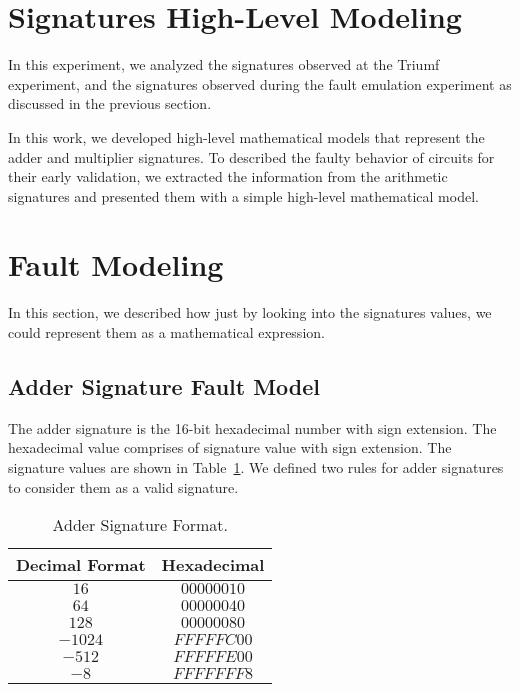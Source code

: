 



\section{
Signatures High-Level Modeling}

In this experiment, we analyzed the signatures observed at the Triumf experiment, and the signatures observed during the fault emulation experiment as discussed in the previous section.

In this work, we developed high-level mathematical models that represent the adder and multiplier signatures. To described the faulty behavior of circuits for their early validation, we extracted the information from the arithmetic signatures and presented them with a simple high-level mathematical model.

\section{Fault Modeling}

In this section, we described how just by looking into the signatures values, we could represent them as a mathematical expression.


\subsection{Adder Signature Fault Model}

The adder signature is the 16-bit hexadecimal number with sign extension. The hexadecimal value comprises of signature value with sign extension. The signature values are shown in Table~\ref{adder signature format}. We defined two rules for adder signatures to consider them as a valid signature.

\begin{table}[tb!]
\center
\caption{Adder Signature Format.}

\label{adder signature format}

\begin{tabular}{|c | c |} 
 \hline
Decimal Format & Hexadecimal   \\ 
\hline

 
 
 $16$& $00000010$    \\
 \hline
 $64$ & $00000040$  \\ 
 \hline
 
 $128$ & $00000080$  \\
 \hline
 $-1024$ & $FFFFFC00$ \\
 \hline
 $-512$ & $FFFFFE00$ \\
 \hline
 $-8$ & $FFFFFFF8$   \\
 \hline
 
 
\end{tabular}
\end{table}


